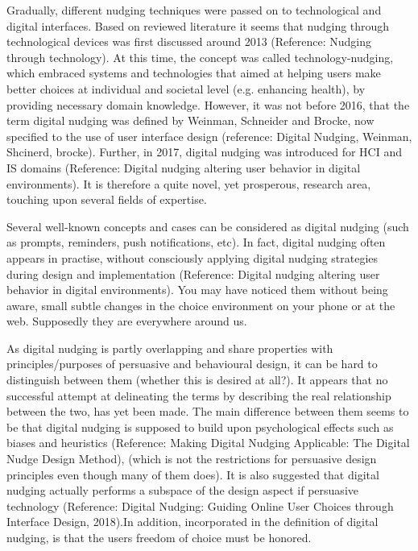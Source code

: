 Gradually, different nudging techniques were passed on to technological and digital interfaces. Based on reviewed literature it seems that nudging through technological devices was first discussed around 2013 (Reference: Nudging through technology). At this time, the concept was called technology-nudging, which embraced systems and technologies that aimed at helping users make better choices at individual and societal level (e.g. enhancing health), by providing necessary domain knowledge. However, it was not before 2016, that the term digital nudging was defined by Weinman, Schneider and Brocke, now specified to the use of user interface design (reference: Digital Nudging, Weinman, Shcinerd, brocke). Further, in 2017, digital nudging was introduced for HCI and IS domains (Reference: Digital nudging altering user behavior in digital environments). It is therefore a quite novel, yet prosperous, research area, touching upon several fields of expertise.

Several well-known concepts and cases can be considered as digital nudging (such as prompts, reminders, push notifications, etc). In fact, digital nudging often appears in practise, without consciously applying digital nudging strategies during design and implementation (Reference: Digital nudging altering user behavior in digital environments). You may have noticed them without being aware, small subtle changes in the choice environment on your phone or at the web. Supposedly they are everywhere around us. 

As digital nudging is partly overlapping and share properties with principles/purposes of persuasive and behavioural design, it can be hard to distinguish between them (whether this is desired at all?). It appears that no successful attempt at delineating the terms by describing the real relationship between the two, has yet been made. The main difference between them seems to be that digital nudging is supposed to build upon psychological effects such as biases and heuristics (Reference: Making Digital Nudging Applicable: The Digital Nudge Design Method), (which is not the restrictions for persuasive design principles even though many of them does). It is also suggested that digital nudging actually performs a subspace of the design aspect if persuasive technology (Reference: Digital Nudging: Guiding Online User Choices through Interface Design, 2018).In addition, incorporated in the definition of digital nudging, is that the users freedom of choice must be honored. 


